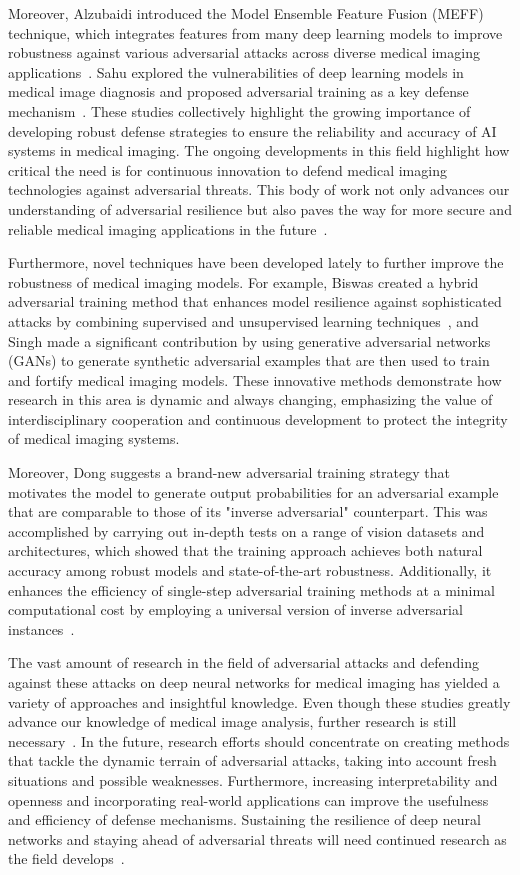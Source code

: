 \documentclass[preprint,12pt]{elsarticle}
\begin{document}
Moreover, Alzubaidi introduced the Model Ensemble Feature Fusion (MEFF) technique, which integrates features from many deep learning models to improve robustness against various adversarial attacks across diverse medical imaging applications~\cite{Alzubaidi24}. Sahu explored the vulnerabilities of deep learning models in medical image diagnosis and proposed adversarial training as a key defense mechanism~\cite{Sahu24}. These studies collectively highlight the growing importance of developing robust defense strategies to ensure the reliability and accuracy of AI systems in medical imaging. The ongoing developments in this field highlight how critical the need is for continuous innovation to defend medical imaging technologies against adversarial threats. This body of work not only advances our understanding of adversarial resilience but also paves the way for more secure and reliable medical imaging applications in the future~\cite{Ou24}.

Furthermore, novel techniques have been developed lately to further improve the robustness of medical imaging models. For example, Biswas created a hybrid adversarial training method that enhances model resilience against sophisticated attacks by combining supervised and unsupervised learning techniques~\cite{Biswas24}, and Singh made a significant contribution by using generative adversarial networks (GANs) to generate synthetic adversarial examples that are then used to train and fortify medical imaging models. These innovative methods demonstrate how research in this area is dynamic and always changing, emphasizing the value of interdisciplinary cooperation and continuous development to protect the integrity of medical imaging systems.

Moreover, Dong suggests a brand-new adversarial training strategy that motivates the model to generate output probabilities for an adversarial example that are comparable to those of its "inverse adversarial" counterpart. This was accomplished by carrying out in-depth tests on a range of vision datasets and architectures, which showed that the training approach achieves both natural accuracy among robust models and state-of-the-art robustness. Additionally, it enhances the efficiency of single-step adversarial training methods at a minimal computational cost by employing a universal version of inverse adversarial instances~\cite{Dong24}.

The vast amount of research in the field of adversarial attacks and defending against these attacks on deep neural networks for medical imaging has yielded a variety of approaches and insightful knowledge. Even though these studies greatly advance our knowledge of medical image analysis, further research is still necessary~\cite{Li23}. In the future, research efforts should concentrate on creating methods that tackle the dynamic terrain of adversarial attacks, taking into account fresh situations and possible weaknesses. Furthermore, increasing interpretability and openness and incorporating real-world applications can improve the usefulness and efficiency of defense mechanisms. Sustaining the resilience of deep neural networks and staying ahead of adversarial threats will need continued research as the field develops~\cite{Eli24}.
\end{document}
